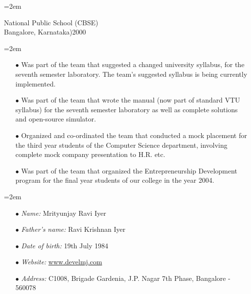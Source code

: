\documentclass{scrartcl}
\newcommand{\MarginDate}[1]{\marginpar{\raggedleft\itshape\small#1}}
\newcommand{\Description}[1]{\hangindent=2em\hangafter=0\noindent\raggedright\footnotesize{#1}\par\normalsize}
\begin{document}
\begin{cv}{
\href{http://www.develmj.com}{}
}
\vspace{1em}

\Description{National Public School (CBSE)\MarginDate{Standard 10}\\Bangalore, Karnataka)\hfill{2000}
}

\vspace{1.5em}

\noindent{}
\vspace{0.5em}

\Description{
\begin{itemize}
  \item[\footnotesize$\bullet$] Was part of the team that suggested a changed university syllabus, for the seventh semester laboratory. The team's suggested syllabus is being currently implemented.
  \item[\footnotesize$\bullet$] Was part of the team that wrote the manual (now part of
  standard VTU syllabus) for the seventh
  semester laboratory as well as complete solutions and open-source
  simulator.
  \item[\footnotesize$\bullet$] Organized and co-ordinated the team
    that conducted a mock placement for the third year students of the
    Computer Science department, involving complete mock company presentation to H.R. etc.
  \item[\footnotesize$\bullet$] Was part of the team that organized
    the Entrepreneurship Development program for the final year
    students of our college in the year 2004.
\end{itemize}
}

\vspace{1.5em}

\noindent{}
\vspace{0.5em}

\Description{
\begin{itemize}
  \item[\footnotesize$\bullet$] \textsl{Name:} Mrityunjay Ravi Iyer
  \item[\footnotesize$\bullet$] \textsl{Father's name:} Ravi Krishnan Iyer
  \item[\footnotesize$\bullet$] \textsl{Date of birth:} 19th July 1984
  \item[\footnotesize$\bullet$] \textsl{Website:} \url{www.develmj.com}
  \item[\footnotesize$\bullet$] \textsl{Address:} C1008, Brigade
    Gardenia, J.P. Nagar 7th Phase, Bangalore - 560078
\end{itemize}
}
\end{cv}
\end{document}
